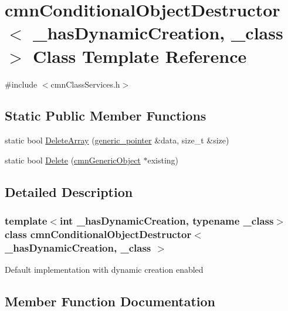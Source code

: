 \hypertarget{classcmn_conditional_object_destructor}{}\section{cmn\+Conditional\+Object\+Destructor$<$ \+\_\+has\+Dynamic\+Creation, \+\_\+class $>$ Class Template Reference}
\label{classcmn_conditional_object_destructor}


{\ttfamily \#include $<$cmn\+Class\+Services.\+h$>$}

\subsection*{Static Public Member Functions}
\begin{DoxyCompactItemize}
\item 
static bool \hyperlink{classcmn_conditional_object_destructor_a06fad8de84abc650a73ce8adc7edf2a9}{Delete\+Array} (\hyperlink{classcmn_generic_object}{generic\+\_\+pointer} \&data, size\+\_\+t \&size)
\item 
static bool \hyperlink{classcmn_conditional_object_destructor_a406a9967de6c2eb7a7996f00976cd885}{Delete} (\hyperlink{classcmn_generic_object}{cmn\+Generic\+Object} $\ast$existing)
\end{DoxyCompactItemize}


\subsection{Detailed Description}
\subsubsection*{template$<$int \+\_\+has\+Dynamic\+Creation, typename \+\_\+class$>$class cmn\+Conditional\+Object\+Destructor$<$ \+\_\+has\+Dynamic\+Creation, \+\_\+class $>$}

Default implementation with dynamic creation enabled 

\subsection{Member Function Documentation}
\hypertarget{classcmn_conditional_object_destructor_a406a9967de6c2eb7a7996f00976cd885}{}
